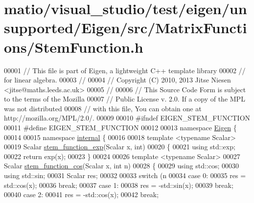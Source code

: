 \hypertarget{matio_2visual__studio_2test_2eigen_2unsupported_2_eigen_2src_2_matrix_functions_2_stem_function_8h_source}{}\section{matio/visual\+\_\+studio/test/eigen/unsupported/\+Eigen/src/\+Matrix\+Functions/\+Stem\+Function.h}
\label{matio_2visual__studio_2test_2eigen_2unsupported_2_eigen_2src_2_matrix_functions_2_stem_function_8h_source}

\begin{DoxyCode}
00001 \textcolor{comment}{// This file is part of Eigen, a lightweight C++ template library}
00002 \textcolor{comment}{// for linear algebra.}
00003 \textcolor{comment}{//}
00004 \textcolor{comment}{// Copyright (C) 2010, 2013 Jitse Niesen <jitse@maths.leeds.ac.uk>}
00005 \textcolor{comment}{//}
00006 \textcolor{comment}{// This Source Code Form is subject to the terms of the Mozilla}
00007 \textcolor{comment}{// Public License v. 2.0. If a copy of the MPL was not distributed}
00008 \textcolor{comment}{// with this file, You can obtain one at http://mozilla.org/MPL/2.0/.}
00009 
00010 \textcolor{preprocessor}{#ifndef EIGEN\_STEM\_FUNCTION}
00011 \textcolor{preprocessor}{#define EIGEN\_STEM\_FUNCTION}
00012 
00013 \textcolor{keyword}{namespace }\hyperlink{namespace_eigen}{Eigen} \{ 
00014 
00015 \textcolor{keyword}{namespace }\hyperlink{namespaceinternal}{internal} \{
00016 
00018 \textcolor{keyword}{template} <\textcolor{keyword}{typename} Scalar>
00019 Scalar \hyperlink{namespace_eigen_1_1internal_a0e7bafccf7fa66d965ab6c59444a39c3}{stem\_function\_exp}(Scalar x, \textcolor{keywordtype}{int})
00020 \{
00021   \textcolor{keyword}{using} std::exp;
00022   \textcolor{keywordflow}{return} exp(x);
00023 \}
00024 
00026 \textcolor{keyword}{template} <\textcolor{keyword}{typename} Scalar>
00027 Scalar \hyperlink{namespace_eigen_1_1internal_a9727c15ffb97a40df226fce93e2628b3}{stem\_function\_cos}(Scalar x, \textcolor{keywordtype}{int} n)
00028 \{
00029   \textcolor{keyword}{using} std::cos;
00030   \textcolor{keyword}{using} std::sin;
00031   Scalar res;
00032 
00033   \textcolor{keywordflow}{switch} (n %
00034   \textcolor{keywordflow}{case} 0: 
00035     res = std::cos(x);
00036     \textcolor{keywordflow}{break};
00037   \textcolor{keywordflow}{case} 1:
00038     res = -std::sin(x);
00039     \textcolor{keywordflow}{break};
00040   \textcolor{keywordflow}{case} 2:
00041     res = -std::cos(x);
00042     \textcolor{keywordflow}{break};

\end{DoxyCode}
